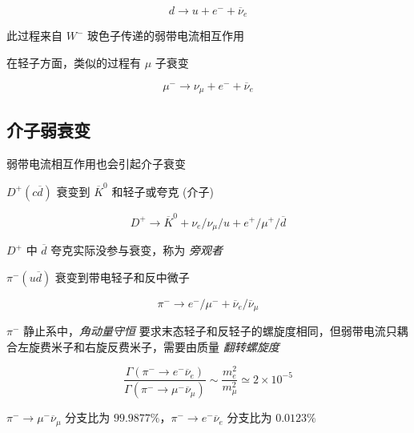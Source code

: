 \begin{equation}
    d \to u + e^- + \overline{\nu}_e
\end{equation}

此过程来自 $W^-$ 玻色子传递的弱带电流相互作用

在轻子方面，类似的过程有 $\mu$ 子衰变

\begin{equation}
    \mu^- \to \nu_\mu + e^- + \overline{\nu}_e
\end{equation}

\subsection{介子弱衰变}

弱带电流相互作用也会引起介子衰变

$D^+(c\overline{d})$ 衰变到 $\overline{K}^0$ 和轻子或夸克 (介子)

\begin{equation}
    D^+ \to \overline{K}^0 + \nu_e / \nu_\mu / u + e^+ / \mu^+ / \overline{d}
\end{equation}

$D^+$ 中 $\overline{d}$ 夸克实际没参与衰变，称为 \emph{旁观者}

$\pi^-(u\overline{d})$ 衰变到带电轻子和反中微子

\begin{equation}
    \pi^- \to e^- / \mu^- + \overline{\nu}_e / \overline{\nu}_\mu
\end{equation}

$\pi^-$ 静止系中，\emph{角动量守恒} 要求末态轻子和反轻子的螺旋度相同，但弱带电流只耦合左旋费米子和右旋反费米子，需要由质量 \emph{翻转螺旋度}

\begin{equation}
    \frac{\Gamma(\pi^- \to e^- \overline{\nu}_e)}{\Gamma(\pi^- \to \mu^- \overline{\nu}_\mu)} \sim \frac{m_e^2}{m_\mu^2} \simeq 2 \times 10^{-5}
\end{equation}

$\pi^- \to \mu^- \overline{\nu}_\mu$ 分支比为 $99.9877\%$，$\pi^- \to e^- \overline{\nu}_e$ 分支比为 $0.0123\%$
